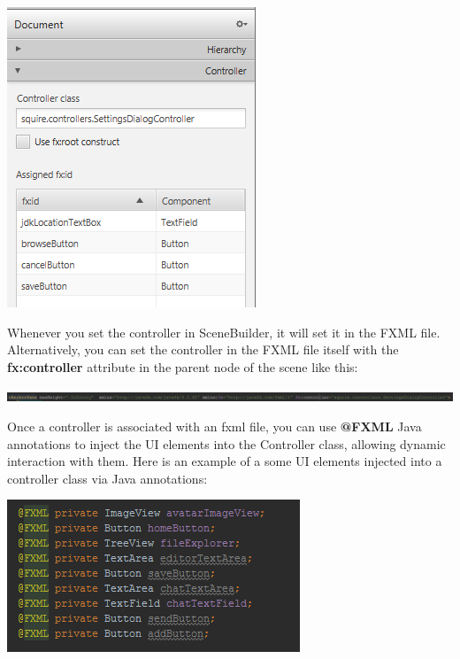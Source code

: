 \documentclass[twoside,letterpaper]{article}
\begin{document}
\begin{center}
	\includegraphics[scale=1]{images/Implementation/SceneBuilder.png}
\end{center}

Whenever you set the controller in SceneBuilder, it will set it in the FXML file. Alternatively, you can set the controller in the FXML file itself with the \textbf{fx:controller} attribute in the parent node of the scene like this:

\begin{center}
	\includegraphics[width=\textwidth]{images/Implementation/Controller.png}
\end{center}

Once a controller is associated with an fxml file, you can use \textbf{@FXML} Java annotations to inject the UI elements into the Controller class, allowing dynamic interaction with them. Here is an example of a some UI elements injected into a controller class via Java annotations:

\begin{center}
	\includegraphics[scale=1.2]{images/Implementation/FxmlAnnotations.png}
\end{center}
\end{document}
